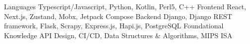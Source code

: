 
\begin{cvskills}
  \cvskill
    {Languages} %
    {Typescript/Javascript, Python, Kotlin, Perl5, C++} %
  \cvskill
    {Frontend}
    {React, Next.js, Zustand, Mobx, Jetpack Compose}
  \cvskill
    {Backend} %
    {Django, Django REST framework, Flask, Scrapy, Express.js, Hapi.js, PostgreSQL} %
  \cvskill
    {Foundational Knowledge}
    {API Design, CI/CD, Data Structures \& Algorithms, MIPS ISA}
\end{cvskills}
